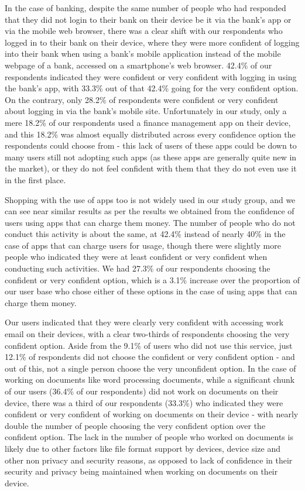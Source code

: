 \documentclass{sigchi}
\begin{document}
In the case of banking, despite the same number of people who had responded that they did not login to their bank on their device be it via the bank's app or via the mobile web browser, there was a clear shift with our respondents who logged in to their bank on their device, where they were more confident of logging into their bank when using a bank's mobile application instead of the mobile webpage of a bank, accessed on a smartphone's web browser. 42.4\% of our respondents indicated they were confident or very confident with logging in using the bank's app, with 33.3\% out of that 42.4\% going for the very confident option. On the contrary, only 28.2\% of respondents were confident or very confident about logging in via the bank's mobile site. Unfortunately in our study, only a mere 18.2\% of our respondents used a finance management app on their device, and this 18.2\% was almost equally distributed across every confidence option the respondents could choose from - this lack of users of these apps could be down to many users still not adopting such apps (as these apps are generally quite new in the market), or they do not feel confident with them that they do not even use it in the first place.

Shopping with the use of apps too is not widely used in our study group, and we can see near similar results as per the results we obtained from the confidence of users using apps that can charge them money. The number of people who do not conduct this activity is about the same, at 42.4\% instead of nearly 40\% in the case of apps that can charge users for usage, though there were slightly more people who indicated they were at least confident or very confident when conducting such activities. We had 27.3\% of our respondents choosing the confident or very confident option, which is a 3.1\% increase over the proportion of our user base who chose either of these options in the case of using apps that can charge them money.

Our users indicated that they were clearly very confident with accessing work email on their devices, with a clear two-thirds of respondents choosing the very confident option. Aside from the 9.1\% of users who did not use this service, just 12.1\% of respondents did not choose the confident or very confident option - and out of this, not a single person choose the very unconfident option. In the case of working on documents like word processing documents, while a significant chunk of our users (36.4\% of our respondents) did not work on documents on their device, there was a third of our respondents (33.3\%) who indicated they were confident or very confident of working on documents on their device - with nearly double the number of people choosing the very confident option over the confident option. The lack in the number of people who worked on documents is likely due to other factors like file format support by devices, device size and other non privacy and security reasons, as opposed to lack of confidence in their security and privacy being maintained when working on documents on their device.
\end{document}
